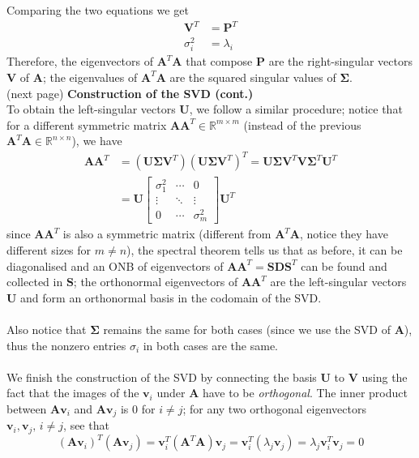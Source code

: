 \documentclass{report}
\begin{document}
Comparing the two equations we get
\begin{align*}
\bm{V}^T&=\bm{P}^T\\
\sigma_i^2&=\lambda_i
\end{align*}
Therefore, the eigenvectors of $\bm{A}^T\bm{A}$ that compose $\bm{P}$ are the right-singular vectors $\bm{V}$ of
$\bm{A}$; the eigenvalues of $\bm{A}^T\bm{A}$ are the squared singular values of $\bm{\Sigma}$.\\
(next page)
\newpage
\noindent\textbf{Construction of the SVD (cont.)}\\
To obtain the left-singular vectors $\bm{U}$, we follow a similar procedure; notice that for
a different symmetric matrix $\bm{AA}^T\in\mathbb{R}^{m\times m}$ (instead of the previous 
$\bm{A}^T\bm{A}\in\mathbb{R}^{n\times n}$), we have
\begin{align*}
\bm{AA}^T&=(\bm{U}\bm{\Sigma}\bm{V}^T)(\bm{U}\bm{\Sigma}\bm{V}^T)^T=
\bm{U}\bm{\Sigma}\bm{V}^T\bm{V\Sigma}^T\bm{U}^T\\
&=\bm{U}\begin{bmatrix}
\sigma^2_1&\cdots&0\\\vdots&\ddots&\vdots\\0&\cdots&
\sigma^2_m
\end{bmatrix}\bm{U}^T
\end{align*}
since $\bm{AA}^T$ is also a symmetric matrix (different from $\bm{A}^T\bm{A}$, notice they have different sizes 
for $m\neq n$), the spectral theorem tells us that as before, it can be diagonalised and an ONB of eigenvectors
of $\bm{AA}^T=\bm{SDS}^T$ can be found and collected in $\bm{S}$; the orthonormal eigenvectors of $\bm{AA}^T$ are
the left-singular vectors $\bm{U}$ and form an orthonormal basis in the codomain of the SVD.\\
\vspace{1mm}\\
Also notice that $\bm{\Sigma}$ remains the same for both cases (since we use the SVD of $\bm{A}$), thus the nonzero
entries $\sigma_i$ in both cases are the same.\\
\vspace{1mm}\\
We finish the construction of the SVD by connecting the basis $\bm{U}$ to $\bm{V}$ using the fact that 
the images of the $\bm{v}_i$ under $\bm{A}$ have to be \textit{orthogonal}.
The inner product between $\bm{Av}_i$ and $\bm{Av}_j$ is 0 for $i\neq j$; for any two orthogonal eigenvectors
$\bm{v}_i,\bm{v}_j,\,i\neq j$, see that
\begin{equation*}
(\bm{Av}_i)^T(\bm{Av}_j)=\bm{v}_i^T(\bm{A}^T\bm{A})\bm{v}_j=
\bm{v}_i^T(\lambda_j\bm{v}_j)=\lambda_j\bm{v}_i^T\bm{v}_j=0
\end{equation*}
\end{document}
